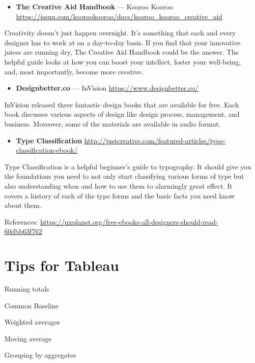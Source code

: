 \documentclass[]{book}
\providecommand{\tightlist}{%
  \setlength{\itemsep}{0pt}\setlength{\parskip}{0pt}}
\theoremstyle{definition}
\theoremstyle{definition}
\theoremstyle{definition}
\theoremstyle{remark}
\begin{document}
\begin{itemize}
\tightlist
\item
  \textbf{The Creative Aid Handbook} --- Kooroo Kooroo
  \url{https://issuu.com/koorookooroo/docs/kooroo_kooroo_creative_aid}
\end{itemize}

Creativity doesn't just happen overnight. It's something that each and
every designer has to work at on a day-to-day basis. If you find that
your innovative juices are running dry, The Creative Aid Handbook could
be the answer. The helpful guide looks at how you can boost your
intellect, foster your well-being, and, most importantly, become more
creative.

\begin{itemize}
\tightlist
\item
  \textbf{Designbetter.co} --- InVision
  \url{https://www.designbetter.co/}
\end{itemize}

InVision released three fantastic design books that are available for
free. Each book discusses various aspects of design like design process,
management, and business. Moreover, some of the materials are available
in audio format.

\begin{itemize}
\tightlist
\item
  \textbf{Type Classification}
  \url{http://justcreative.com/featured-articles/type-classification-ebook/}
\end{itemize}

Type Classification is a helpful beginner's guide to typography. It
should give you the foundations you need to not only start classifying
various forms of type but also understanding when and how to use them to
alarmingly great effect. It covers a history of each of the type forms
and the basic facts you need know about them.

References:
\url{https://uxplanet.org/free-ebooks-all-designers-should-read-60dbb63f762}

\section{Tips for Tableau}\label{tips-for-tableau}

Running totals

Common Baseline

Weighted averages

Moving average

Grouping by aggregates
\end{document}
